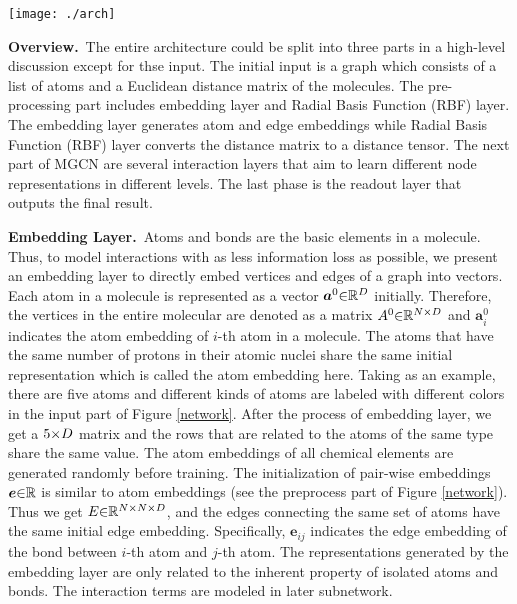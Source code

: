 \documentclass[letterpaper]{article} \usepackage{bm}
\begin{document}
\begin{figure*}[tb]
\centerline{\texttt{[image: ./arch]}}
\caption{The architecture of the entire MGCN.} 
\label{network}
\end{figure*}


\textbf{Overview.}\ The entire architecture could be split into three parts in a high-level discussion except for thse input. The initial input is a graph which consists of a list of atoms and a Euclidean distance matrix of the molecules. The pre-processing part includes embedding layer and Radial Basis Function (RBF) layer. The embedding layer generates atom and edge embeddings while Radial Basis Function (RBF) layer converts the distance matrix to a distance tensor. The next part of MGCN are several interaction layers that aim to learn different node representations in different levels. The last phase is the readout layer that outputs the final result. 

\textbf{Embedding Layer.}\ Atoms and bonds are the basic elements in a molecule. Thus, to model interactions with as less information loss as possible, we present an embedding layer to directly embed vertices and edges of a graph into vectors.
Each atom in a molecule is represented as a vector $\bm{a}^0\scriptsize{\in} \mathbb{R}^D$ initially. Therefore, the vertices in the entire molecular are denoted as a matrix $ A^0 \scriptsize{\in} \mathbb{R}^{N\scriptsize{\times}  D}$ and $\bm{a}^0_i$ indicates the atom embedding of $i$-th atom in a molecule. The atoms that have the same number of protons in their atomic nuclei share the same initial representation which is called the atom embedding here. Taking  as an example, there are five atoms and different kinds of atoms are labeled with different colors in the input part of Figure \ref{network}. After the process of embedding layer, we get a $5 \scriptsize{\times}  D$ matrix and the rows that are related to the atoms of the same type share the same value. The atom embeddings of all chemical elements are generated randomly before training. The initialization of pair-wise embeddings $\bm{e}\scriptsize{\in} \mathbb{R} $ is similar to atom embeddings (see the preprocess part of Figure \ref{network}). Thus we get $E\scriptsize{\in} \mathbb{R}^{N \scriptsize{\times}  N \scriptsize{\times}  D}$, and the edges connecting the same set of atoms have the same initial edge embedding. Specifically, $\bm{e}_{ij}$ indicates the edge embedding of the bond between $i$-th atom and $j$-th atom. The representations generated by the embedding layer are only related to the inherent property of isolated atoms and bonds. The interaction terms are modeled in later subnetwork.  
\end{document}
